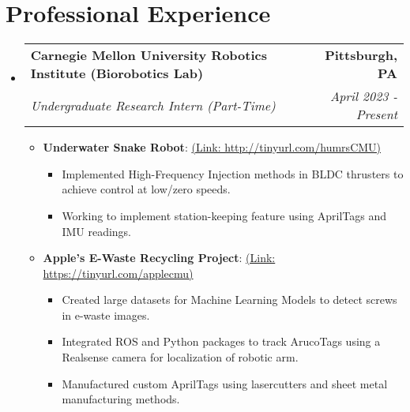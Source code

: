 \documentclass[letterpaper,10pt]{article}
\makeatletter
\newcommand{\resumeItem}[2]{
  \item\small{
    \textbf{#1}{: #2 \vspace{-2pt}}
  }
}
\newcommand{\resumeSubheading}[4]{
  \vspace{-1pt}\item
    \begin{tabular*}{0.97\textwidth}{l@{\extracolsep{\fill}}r}
      \textbf{#1} & \textbf{#2} \\
      \textit{#3} & \textit{#4} \\
    \end{tabular*}\vspace{-5pt}
}
\newcommand{\resumeSubHeadingListStart}{\begin{itemize}[leftmargin=*]}
\newcommand{\resumeSubHeadingListEnd}{\end{itemize}}
\newcommand{\resumeItemListStart}{
  \begin{itemize}
    \setlength\itemsep{0mm}
}
\newcommand{\resumeItemListEnd}{\end{itemize}\vspace{-5pt}}
\makeatother
\begin{document}
\section{Professional Experience}
    \resumeSubHeadingListStart
        \resumeSubheading
            {Carnegie Mellon University Robotics Institute (Biorobotics Lab)}{Pittsburgh, PA}
            {Undergraduate Research Intern (Part-Time)}{April 2023 -  Present}
            \resumeItemListStart
                \resumeItem{Underwater Snake Robot}
                    {\href{http://tinyurl.com/humrsCMU}{(Link: http://tinyurl.com/humrsCMU)}}
                    \begin{itemize}
                      \item Implemented High-Frequency Injection methods in BLDC thrusters to achieve control at low/zero speeds.
                      \item Working to implement station-keeping feature using AprilTags and IMU readings.
                    \end{itemize}
                \resumeItem{Apple's E-Waste Recycling Project}
                    {\href{https://tinyurl.com/applecmu}{(Link: https://tinyurl.com/applecmu)}}
                    \begin{itemize}
                      \item Created large datasets for Machine Learning Models to detect screws in e-waste images.
                      \item Integrated ROS and Python packages to track ArucoTags using a Realsense camera for localization of robotic arm.
                      \item Manufactured custom AprilTags using lasercutters and sheet metal manufacturing methods.
                    \end{itemize}
            \resumeItemListEnd
      \resumeSubHeadingListEnd
\vspace{-5pt}
\end{document}
